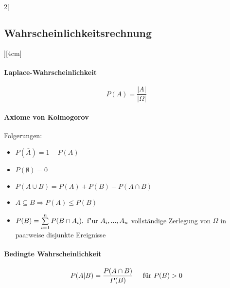\documentclass[8pt]{extarticle}
\begin{document}
\begin{multicols}{2}[\subsection{Wahrscheinlichkeitsrechnung}][4cm]

\paragraph{Laplace-Wahrscheinlichkeit}

$$P(A)=\frac{|A|}{|\Omega|}$$

\paragraph{Axiome von Kolmogorov}




\begin{Mathfolg}

Folgerungen:
\begin{itemize}
\item $P(\bar{A})=1-P(A)$
\item $P(\emptyset)=0$
\item $P(A\cup B)=P(A)+P(B)-P(A\cap B)$
\item $A \subseteq B \Rightarrow P(A) \le P(B)$
\item $P(B)=\sum\limits_{i=1}^n P(B\cap A_i), \textnormal{ f"ur } A_i,...,A_n$  vollst\"andige Zerlegung von  $\Omega$  in paarweise disjunkte Ereignisse
\end{itemize}

\end{Mathfolg}

\paragraph{Bedingte Wahrscheinlichkeit}

$$P(A|B)=\frac{P(A \cap B)}{P(B)} \hspace{0.5cm} \text{für } P(B) > 0$$


\end{multicols}
\end{document}
